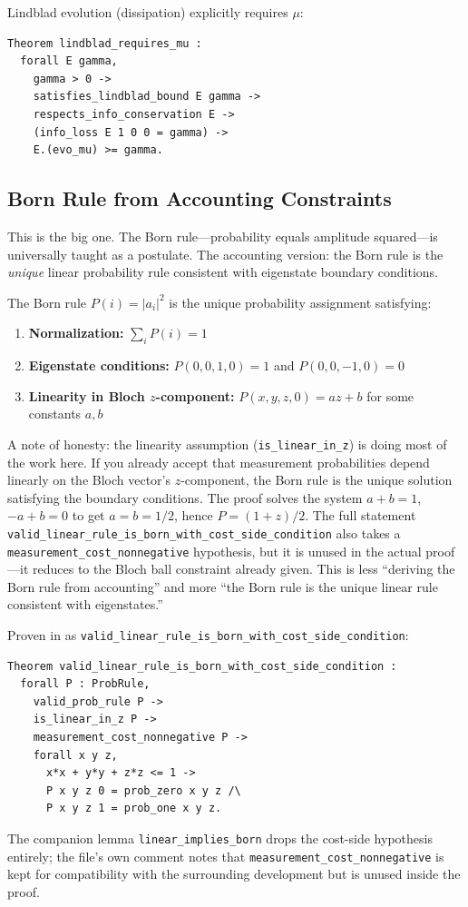 Lindblad evolution (dissipation) explicitly requires $\mu$:
\begin{lstlisting}
Theorem lindblad_requires_mu :
  forall E gamma,
    gamma > 0 ->
    satisfies_lindblad_bound E gamma ->
    respects_info_conservation E ->
    (info_loss E 1 0 0 = gamma) ->
    E.(evo_mu) >= gamma.
\end{lstlisting}

\subsection{Born Rule from Accounting Constraints}

This is the big one. The Born rule---probability equals amplitude squared---is universally taught as a postulate. The accounting version: the Born rule is the \textit{unique} linear probability rule consistent with eigenstate boundary conditions.

\begin{theorem}
The Born rule $P(i) = |a_i|^2$ is the unique probability assignment satisfying:
\begin{enumerate}
    \item \textbf{Normalization:} $\sum_i P(i) = 1$
    \item \textbf{Eigenstate conditions:} $P(0,0,1,0) = 1$ and $P(0,0,-1,0) = 0$
    \item \textbf{Linearity in Bloch $z$-component:} $P(x,y,z,0) = az + b$ for some constants $a, b$
\end{enumerate}
\end{theorem}

A note of honesty: the linearity assumption (\texttt{is\_linear\_in\_z}) is doing most of the work here. If you already accept that measurement probabilities depend linearly on the Bloch vector's $z$-component, the Born rule is the unique solution satisfying the boundary conditions. The proof solves the system $a + b = 1$, $-a + b = 0$ to get $a = b = 1/2$, hence $P = (1+z)/2$. The full statement \texttt{valid\_linear\_rule\_is\_born\_with\_cost\_side\_condition} also takes a \texttt{measurement\_cost\_nonnegative} hypothesis, but it is unused in the actual proof---it reduces to the Bloch ball constraint already given. This is less ``deriving the Born rule from accounting'' and more ``the Born rule is the unique linear rule consistent with eigenstates.''

Proven in  as \texttt{valid\_linear\_rule\_is\_born\_with\_cost\_side\_condition}:
\begin{lstlisting}
Theorem valid_linear_rule_is_born_with_cost_side_condition :
  forall P : ProbRule,
    valid_prob_rule P ->
    is_linear_in_z P ->
    measurement_cost_nonnegative P ->
    forall x y z,
      x*x + y*y + z*z <= 1 ->
      P x y z 0 = prob_zero x y z /\
      P x y z 1 = prob_one x y z.
\end{lstlisting}
The companion lemma \texttt{linear\_implies\_born} drops the cost-side hypothesis entirely; the file's own comment notes that \texttt{measurement\_cost\_nonnegative} is kept for compatibility with the surrounding development but is unused inside the proof.

